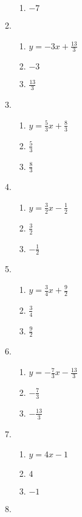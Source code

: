 \documentclass[a4paper,12pt]{article}
\begin{document}
\begin{enumerate}
\begin{multicols}{2}
\begin{enumerate}
\begin{enumerate}
        \item $-7$
        \end{enumerate}
    \item
        \begin{enumerate}
        \item $y = -3x + \frac{13}{3}$
        \item $-3$
        \item $\frac{13}{3}$
        \end{enumerate}
    \item
        \begin{enumerate}
        \item $y = \frac{5}{3}x + \frac{8}{3}$
        \item $\frac{5}{3}$
        \item $\frac{8}{3}$
        \end{enumerate}
    \item
        \begin{enumerate}
        \item $y = \frac{3}{2}x - \frac{1}{2}$
        \item $\frac{3}{2}$
        \item $-\frac{1}{2}$
        \end{enumerate}
    \item
        \begin{enumerate}
        \item $y = \frac{3}{4}x + \frac{9}{2}$
        \item $\frac{3}{4}$
        \item $\frac{9}{2}$
        \end{enumerate}
    \item
        \begin{enumerate}
        \item $y = -\frac{7}{3}x - \frac{13}{3}$
        \item $-\frac{7}{3}$
        \item $-\frac{13}{3}$
        \end{enumerate}
    \item
        \begin{enumerate}
        \item $y = 4x - 1$
        \item $4$
        \item $-1$
        \end{enumerate}
    \item
        \begin{enumerate}

\end{enumerate}
\end{enumerate}
\end{multicols}
\end{enumerate}
\end{document}
